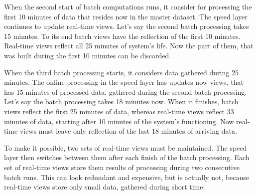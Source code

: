 When the second start of batch computations runs, it consider for processing the first 10 minutes of data that resides now in the master dataset.
The speed layer continues to update real-time views.
Let's say the second batch processing takes 15 minutes.
To its end batch views have the reflection of the first 10 minutes.
Real-time views reflect all 25 minutes of system's life.
Now the part of them, that was built during the first 10 minutes can be discarded.

When the third batch processing starts, it considers data gathered during 25 minutes.
The online processing in the speed layer has updates now views, that has 15 minutes of processed data, gathered during the second batch processing.
Let's say the batch processing takes 18 minutes now.
When it finishes, batch views reflect the first 25 minutes of data, whereas real-time views reflect 33 minutes of data, starting after 10 minutes of the system's functioning.
Now real-time views must leave only reflection of the last 18 minutes of arriving data.

To make it possible, two sets of real-time views must be maintained.
The speed layer then switches between them after each finish of the batch processing.
Each set of real-time views store them results of processing during two consecutive batch runs.
This can look redundant and expensive, but is actually not, because real-time views store only small data, gathered during short time.
